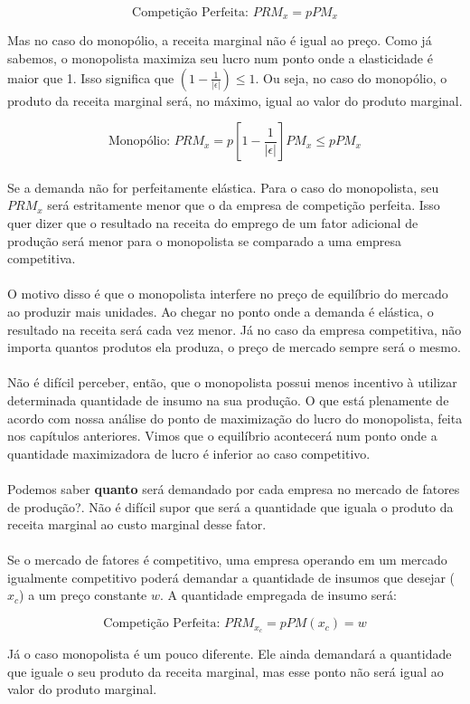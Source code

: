 \documentclass[a4paper,11pt,oneside]{book}
\theoremstyle{definition}
\theoremstyle{break}
\begin{document}
$$ \textrm{Competição Perfeita: } PRM_x = p PM_x $$

Mas no caso do monopólio, a receita marginal não é igual ao preço. Como já sabemos, o monopolista maximiza seu lucro num ponto onde a elasticidade é maior que 1. Isso significa que $\left( 1 - \frac{1}{|\epsilon|} \right) \leq 1 $. Ou seja, no caso do monopólio, o produto da receita marginal será, no máximo, igual ao valor do produto marginal.

$$ \textrm{Monopólio: } PRM_x = p \left[ 1 - \frac{1}{|\epsilon|} \right] PM_x \leq pPM_x $$
\\
Se a demanda não for perfeitamente elástica. Para o caso do monopolista, seu $PRM_x$ será estritamente menor que o da empresa de competição perfeita. Isso quer dizer que o resultado na receita do emprego de um fator adicional de produção será menor para o monopolista se comparado a uma empresa competitiva.
\\
\\
O motivo disso é que o monopolista interfere no preço de equilíbrio do mercado ao produzir mais unidades. Ao chegar no ponto onde a demanda é elástica, o resultado na receita será cada vez menor. Já no caso da empresa competitiva, não importa quantos produtos ela produza, o preço de mercado sempre será o mesmo.
\\
\\
Não é difícil perceber, então, que o monopolista possui menos incentivo à utilizar determinada quantidade de insumo na sua produção. O que está plenamente de acordo com nossa análise do ponto de maximização do lucro do monopolista, feita nos capítulos anteriores. Vimos que o equilíbrio acontecerá num ponto onde a quantidade maximizadora de lucro é inferior ao caso competitivo.
\\
\\
Podemos saber \textbf{quanto} será demandado por cada empresa no mercado de fatores de produção?. Não é difícil supor que será a quantidade que iguala o produto da receita marginal ao custo marginal desse fator.
\\
\\
Se o mercado de fatores é competitivo, uma empresa operando em um mercado igualmente competitivo poderá demandar a quantidade de insumos que desejar ($x_c$) a um preço constante $w$. A quantidade empregada de insumo será:

$$ \textrm{Competição Perfeita: } PRM_{x_c} = pPM(x_c) = w $$

Já o caso monopolista é um pouco diferente. Ele ainda demandará a quantidade que iguale o seu produto da receita marginal, mas esse ponto não será igual ao valor do produto marginal.
\end{document}
